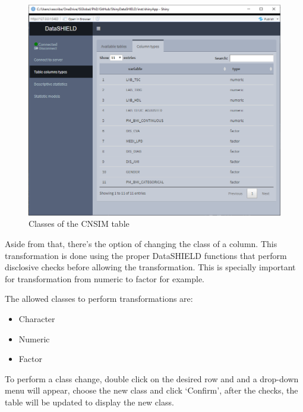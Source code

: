 \documentclass[
]{book}
\providecommand{\tightlist}{%
  \setlength{\itemsep}{0pt}\setlength{\parskip}{0pt}}
\begin{document}
\begin{figure}

{\centering \includegraphics[width=12.67in]{images/table_columns_1} 

}

\caption{Classes of the CNSIM table}\label{fig:tableclass1}
\end{figure}

Aside from that, there's the option of changing the class of a column. This transformation is done using the proper DataSHIELD functions that perform disclosive checks before allowing the transformation. This is specially important for transformation from numeric to factor for example.

The allowed classes to perform transformations are:

\begin{itemize}
\tightlist
\item
  Character
\item
  Numeric
\item
  Factor
\end{itemize}

To perform a class change, double click on the desired row and and a drop-down menu will appear, choose the new class and click `Confirm', after the checks, the table will be updated to display the new class.
\end{document}
